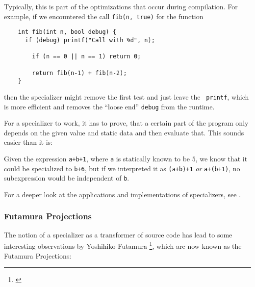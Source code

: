 Typically, this is part of the optimizations that occur during compilation. For
example, if we encountered the call {\tt fib(n, true)} for the function

\begin{verbatim}
	int fib(int n, bool debug) {
	  if (debug) printf("Call with %d", n);

	 	if (n == 0 || n == 1) return 0;

	 	return fib(n-1) + fib(n-2);
	}
\end{verbatim}
then the specializer might remove the first test and just leave the {\tt 
printf}, which is more efficient and removes the ``loose end'' {\tt debug}  
from the runtime.

For a specializer to work, it has to prove, that a certain part of the 
program only depends on the given value and static data and then evaluate 
that. This sounds easier than it is: 
\begin{example}
	Given the expression {\tt a+b+1}, where {\tt a} is statically known to be $5$, 
	we know that it could be specialized to {\tt b+6}, but if we interpreted it 
	as {\tt (a+b)+1} {\em or} {\tt a+(b+1)}, no subexpression would be
	independent of {\tt b}.
\end{example}
For a deeper look at the applications and implementations of specializers, 
see \cite{jones1993partial}.


\subsubsection{Futamura Projections} %
\label{ssub:Futamura Projections}
The notion of a specializer as a transformer of source code has lead to some 
interesting observations by Yoshihiko Futamura
\footnote{\cite{futamura1999partial}}, which are now known as the Futamura
Projections:

